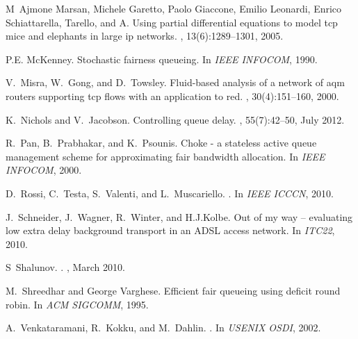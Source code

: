 \documentclass[conference]{IEEEtran}
\begin{document}
\begin{thebibliography}{10}
M~Ajmone Marsan, Michele Garetto, Paolo Giaccone, Emilio Leonardi, Enrico
  Schiattarella, Tarello, and A.
\newblock Using partial differential equations to model tcp mice and elephants
  in large ip networks.
, 13(6):1289--1301, 2005.

P.E. McKenney.
\newblock Stochastic fairness queueing.
\newblock In {\em IEEE INFOCOM}, 1990.

V.~Misra, W.~Gong, and D.~Towsley.
\newblock Fluid-based analysis of a network of aqm routers supporting tcp flows
  with an application to red.
, 30(4):151--160, 2000.

K.~Nichols and V.~Jacobson.
\newblock Controlling queue delay.
, 55(7):42--50, July 2012.

R.~Pan, B.~Prabhakar, and K.~Psounis.
\newblock Choke - a stateless active queue management scheme for approximating
  fair bandwidth allocation.
\newblock In {\em IEEE INFOCOM}, 2000.

D.~Rossi, C.~Testa, S.~Valenti, and L.~Muscariello.
.
\newblock In {\em IEEE ICCCN}, 2010.

J.~Schneider, J.~Wagner, R.~Winter, and H.J.Kolbe.
\newblock Out of my way -- evaluating low extra delay background transport in
  an {ADSL} access network.
\newblock In {\em ITC22}, 2010.

S~Shalunov.
.
, March 2010.

M.~Shreedhar and George Varghese.
\newblock Efficient fair queueing using deficit round robin.
\newblock In {\em ACM SIGCOMM}, 1995.

A.~Venkataramani, R.~Kokku, and M.~Dahlin.
.
\newblock In {\em USENIX OSDI}, 2002.

\end{thebibliography}
\end{document}
